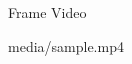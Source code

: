 \documentclass{beamer}
\begin{document}
  \begin{frame}{Frame Video}
    \begin{center}
    {media/sample.mp4} \\%
    \end{center}
  \end{frame}

\end{document}
